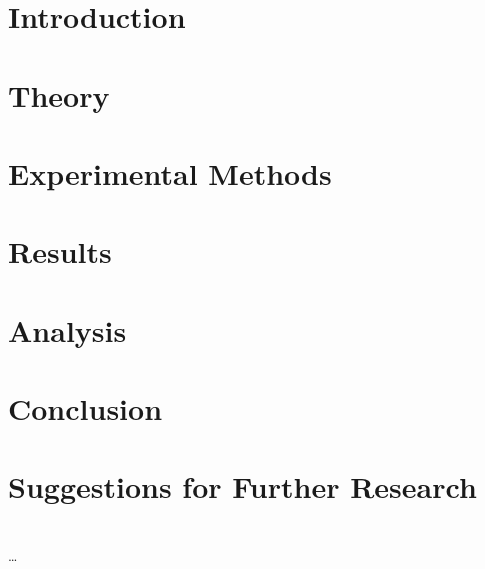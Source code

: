 \begin{abstract}
\dots
\end{abstract}

\maketitle

\section{Introduction}
\label{sec:intro}


\section{Theory}
\label{sec:theory}


\section{Experimental Methods}
\label{sec:experiment}


\section{Results}
\label{sec:results}


\section{Analysis}
\label{sec:analysis}


\section{Conclusion}
\label{sec:conclusion}


\section{Suggestions for Further Research}
\label{sec:further_research}




\begin{acknowledgments}
\end{acknowledgments}


\appendix*

\section{}
\label{sec:}
\subsection{}
\dots
